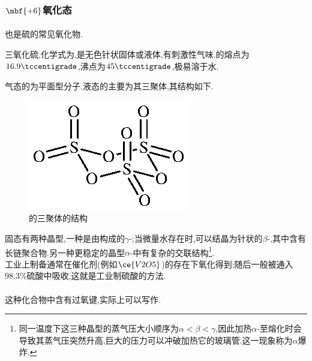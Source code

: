 \documentclass{ctexart}
\begin{document}
\subsubsection{$\mbf{+6}$氧化态}
\paragraph{}
也是硫的常见氧化物.
\begin{substance}[\ce{SO3}]
    三氧化硫,化学式为,是无色针状固体或液体,有刺激性气味.的熔点为$16.9\tccentigrade$,沸点为$45\tccentigrade$,极易溶于水.
\end{substance}
气态的为平面型分子.液态的主要为其三聚体,其结构如下.
\begin{figure}[H]
    \centering\includegraphics{picture/S3O9.eps}
    \caption{的三聚体的结构}
\end{figure}
固态有两种晶型,一种是由构成的$\gamma$-;当微量水存在时,可以结晶为针状的$\beta$-,其中含有长链聚合物.另一种更稳定的晶型$\alpha$-中有复杂的交联结构\footnote{同一温度下这三种晶型的蒸气压大小顺序为$\alpha<\beta<\gamma$,因此加热$\alpha$-至熔化时会导致其蒸气压突然升高,巨大的压力可以冲破加热它的玻璃管.这一现象称为$\alpha$爆炸.}.\\
\indent 工业上制备通常在催化剂(例如$\ce{V2O5}$)的存在下氧化得到;随后一般被通入$98.3\%$硫酸中吸收,这就是工业制硫酸的方法.
\paragraph{}
这种化合物中含有过氧键,实际上可以写作.
\end{document}
